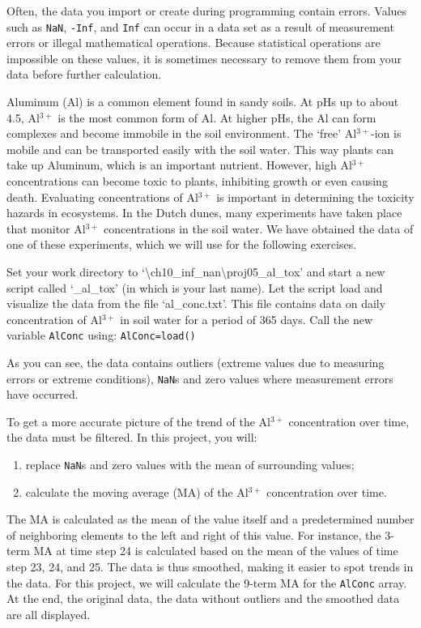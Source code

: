 \label{pr:aluminum-toxicity}
Often, the data you import or create during programming contain errors. Values such as {\tt NaN}, {\tt -Inf}, and {\tt Inf} can occur in a data set as a result of measurement errors or illegal mathematical operations. Because statistical operations are impossible on these values, it is sometimes necessary to remove them from your data before further calculation.

Aluminum (Al) is a common element found in sandy soils. At pHs up to about 4.5, Al$^{3+}$ is the most common form of Al. At higher pHs, the Al can form complexes and become immobile in the soil environment. The `free' Al$^{3+}$-ion is mobile and can be transported easily with the soil water. This way plants can take up Aluminum, which is an important nutrient. However, high Al$^{3+}$ concentrations can become toxic to plants, inhibiting growth or even causing death. Evaluating concentrations of Al$^{3+}$ is important in determining the toxicity hazards in ecosystems. In the Dutch dunes, many experiments have taken place that monitor Al$^{3+}$ concentrations in the soil water. We have obtained the data of one of these experiments, which we will use for the following exercises.

\begin{action}
Set your work directory to `\textbackslash{}ch10\_inf\_nan\textbackslash{}proj05\_al\_tox' and start a new script called `\_al\_tox' (in which  is your last name). Let the script load and visualize the data from the file `al\_conc.txt'. This file contains data on daily concentration of Al$^{3+}$ in soil water for a period of 365 days. Call the new variable {\tt AlConc} using:
{\tt AlConc=load()}
\end{action}
As you can see, the data contains outliers (extreme values due to measuring errors or extreme conditions), {\tt NaN}s and zero values where measurement errors have occurred.

To get a more accurate picture of the trend of the Al$^{3+}$ concentration over time, the data must be filtered. In this project, you will:
\begin{enumerate} 
\item replace {\tt NaN}s and zero values with the mean of surrounding values;
\item calculate the moving average (MA) of the Al$^{3+}$ concentration over time.
\end{enumerate}
The MA is calculated as the mean of the value itself and a predetermined number of neighboring elements to the left and right of this value. For instance, the 3-term MA at time step 24 is calculated based on the mean of the values of time step 23, 24, and 25. The data is thus smoothed, making it easier to spot trends in the data. For this project, we will calculate the 9-term MA for the {\tt AlConc} array. At the end, the original data, the data without outliers and the smoothed data are all displayed.

